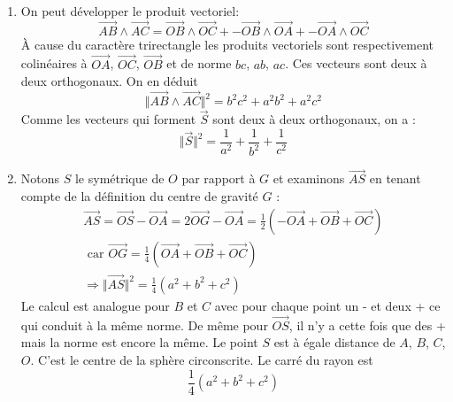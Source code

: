 \begin{enumerate}
 \item On peut développer le produit vectoriel:
\begin{displaymath}
 \overrightarrow{AB}\wedge \overrightarrow{AC}=
 \overrightarrow{OB}\wedge \overrightarrow{OC} +
 -\overrightarrow{OB}\wedge \overrightarrow{OA} +
 -\overrightarrow{OA}\wedge \overrightarrow{OC}
\end{displaymath}
\`A cause du caractère trirectangle les produits vectoriels sont respectivement colinéaires à $\overrightarrow{OA}$, $\overrightarrow{OC}$, $\overrightarrow{OB}$ et de norme $bc$, $ab$, $ac$. Ces vecteurs sont deux à deux orthogonaux. On en déduit
\begin{displaymath}
 \Vert \overrightarrow{AB}\wedge \overrightarrow{AC} \Vert^2
= b^2c^2 + a^2b^2 + a^2c^2
\end{displaymath}
Comme les vecteurs qui forment $\overrightarrow{S}$ sont deux à deux orthogonaux, on a :
\begin{displaymath}
 \Vert \overrightarrow S \Vert^2 = \frac{1}{a^2} + \frac{1}{b^2} + \frac{1}{c^2}
\end{displaymath}
 
 \item Notons $S$ le symétrique de $O$ par rapport à $G$ et examinons $\overrightarrow{AS}$ en tenant compte de la définition du centre de gravité $G$ :
\begin{multline*}
 \overrightarrow{AS} = \overrightarrow{OS} - \overrightarrow{OA}
= 2 \overrightarrow{OG} - \overrightarrow{OA}
= \frac{1}{2}\left(-\overrightarrow{OA}+\overrightarrow{OB}+\overrightarrow{OC} \right)\\
\text{ car }
\overrightarrow{OG}=\frac{1}{4}\left(\overrightarrow{OA}+\overrightarrow{OB}+\overrightarrow{OC} \right) \\
\Rightarrow \Vert \overrightarrow{AS}\Vert^2 =\frac{1}{4}(a^2+b^2+c^2)
\end{multline*}
Le calcul est analogue pour $B$ et $C$ avec pour chaque point un - et deux + ce qui conduit à la même norme. De même pour $\overrightarrow{OS}$, il n'y a cette fois que des + mais la norme est encore la même. Le point $S$ est à égale distance de $A$, $B$, $C$, $O$. C'est le centre de la sphère circonscrite. Le carré du rayon est
\begin{displaymath}
 \frac{1}{4}(a^2+b^2+c^2)
\end{displaymath}
 

\end{enumerate}

